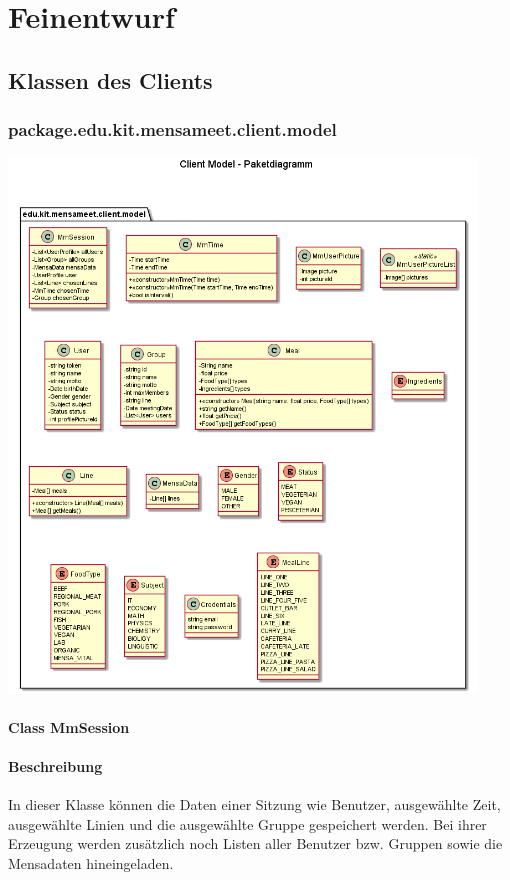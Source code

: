 \documentclass[a4paper]{scrreprt}
\begin{document}
\chapter{Feinentwurf}
\section{Klassen des Clients}


\subsection{package.edu.kit.mensameet.client.model}
\begin{center}
	\includegraphics[width=0.93\textwidth]{GUI/frontend-package-model.png}
\end{center} 


\subsubsection{Class MmSession}
\subsubsection*{Beschreibung}
In dieser Klasse können die Daten einer Sitzung wie Benutzer, ausgewählte Zeit, ausgewählte Linien und die ausgewählte Gruppe gespeichert werden. Bei ihrer Erzeugung werden zusätzlich noch Listen aller Benutzer bzw. Gruppen sowie die Mensadaten hineingeladen.
\end{document}
